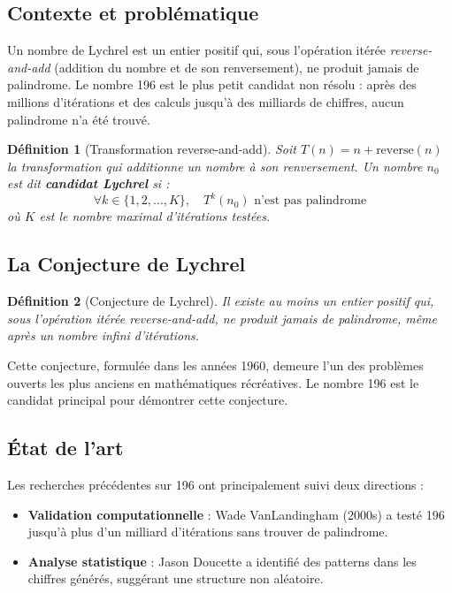 \documentclass[12pt,a4paper]{article}
\newtheorem{definition}{Définition}[section]
\theoremstyle{remark}
\begin{document}
\subsection{Contexte et problématique}

Un nombre de Lychrel est un entier positif qui, sous l'opération itérée \textit{reverse-and-add} (addition du nombre et de son renversement), ne produit jamais de palindrome. Le nombre 196 est le plus petit candidat non résolu : après des millions d'itérations et des calculs jusqu'à des milliards de chiffres, aucun palindrome n'a été trouvé.

\begin{definition}[Transformation reverse-and-add]
Soit $T(n) = n + \text{reverse}(n)$ la transformation qui additionne un nombre à son renversement. Un nombre $n_0$ est dit \textbf{candidat Lychrel} si :
\[
\forall k \in \{1, 2, \ldots, K\}, \quad T^k(n_0) \text{ n'est pas palindrome}
\]
où $K$ est le nombre maximal d'itérations testées.
\end{definition}

\subsection{La Conjecture de Lychrel}

\begin{definition}[Conjecture de Lychrel]
Il existe au moins un entier positif qui, sous l'opération itérée \textit{reverse-and-add}, ne produit jamais de palindrome, même après un nombre infini d'itérations.
\end{definition}

Cette conjecture, formulée dans les années 1960, demeure l'un des problèmes ouverts les plus anciens en mathématiques récréatives. Le nombre 196 est le candidat principal pour démontrer cette conjecture.

\subsection{État de l'art}

Les recherches précédentes sur 196 ont principalement suivi deux directions :

\begin{itemize}
\item \textbf{Validation computationnelle} : Wade VanLandingham (2000s) a testé 196 jusqu'à plus d'un milliard d'itérations sans trouver de palindrome.
\item \textbf{Analyse statistique} : Jason Doucette a identifié des patterns dans les chiffres générés, suggérant une structure non aléatoire.
\end{itemize}
\end{document}
